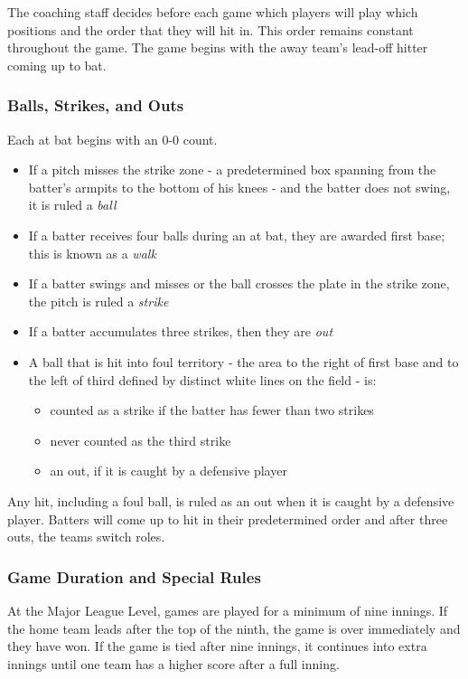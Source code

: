 \documentclass{article}
\begin{document}
The coaching staff decides before each game which players will play which positions and the order that they will hit in. This order remains constant throughout the game. The game begins with the away team's lead-off hitter coming up to bat. 

\subsubsection{Balls, Strikes, and Outs} 
Each at bat begins with an 0-0 count. 

\begin{itemize}
    \item If a pitch misses the strike zone \cite{mlb2023strikezone} - a predetermined box spanning from the batter's armpits to  the bottom of his knees - and the batter does not swing, it is ruled a \textit{ball}
    \item If a batter receives four balls during an at bat, they are awarded first base; this is known as a \textit{walk}

    \item If a batter swings and misses or the ball crosses the plate in the strike zone, the pitch is ruled a \textit{strike}
    \item If a batter accumulates three strikes, then they are \textit{out}

    \item A ball that is hit into foul territory - the area to the right of first base and to the left of third defined by distinct white lines on the field - is:

    \begin{itemize}
        \item counted as a strike if the batter has fewer than two strikes
        \item never counted as the third strike
        \item an out, if it is caught by a defensive player
    \end{itemize}
\end{itemize}

Any hit, including a foul ball, is ruled as an out when it is caught by a defensive player. Batters will come up to hit in their predetermined order and after three outs, the teams switch roles. 

\subsubsection{Game Duration and Special Rules}
At the Major League Level, games are played for a minimum of nine innings. If the home team leads after the top of the ninth, the game is over immediately and they have won. If the game is tied after nine innings, it continues into extra innings until one team has a higher score after a full inning. \cite{mlb2025officialrules}
\end{document}
